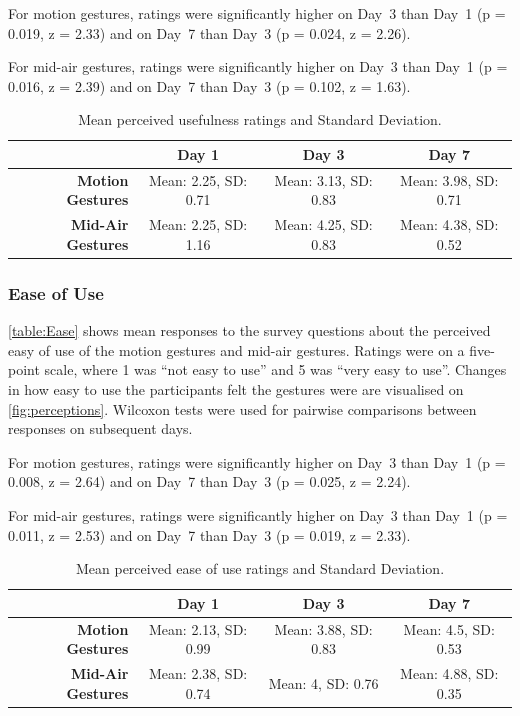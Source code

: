 \documentclass{l4proj}
\begin{document}
For motion gestures, ratings were significantly higher on Day~3 than Day~1 (p = 0.019, z = 2.33) and on Day~7 than Day~3 (p = 0.024, z = 2.26).

For mid-air gestures, ratings were significantly higher on Day~3 than Day~1 (p = 0.016, z = 2.39) and on Day~7 than Day~3 (p = 0.102, z = 1.63).

\begin{table}
\centering
\begin{tabular}{r c c c}
                              & \textbf{Day 1} & \textbf{Day 3} & \textbf{Day 7} \\ \toprule
    \textbf{Motion Gestures}  & Mean: 2.25, SD: 0.71   & Mean: 3.13, SD: 0.83    & Mean: 3.98, SD: 0.71  \\
    \textbf{Mid-Air Gestures} & Mean: 2.25, SD: 1.16   & Mean: 4.25, SD: 0.83    & Mean: 4.38, SD: 0.52 \\ \bottomrule
\end{tabular}
\caption{Mean perceived usefulness ratings and Standard Deviation.}
\label{table:usefulness}
\end{table}




\subsubsection{Ease of Use}

\autoref{table:Ease} shows mean responses to the survey questions about the perceived easy of use of the motion gestures and mid-air gestures. Ratings were on a five-point scale, where 1 was ``not easy to use'' and 5 was ``very easy to use''. Changes in how easy to use the participants felt the gestures were are visualised on \autoref{fig:perceptions}. Wilcoxon tests were used for pairwise comparisons between responses on subsequent days.

For motion gestures, ratings were significantly higher on Day~3 than Day~1 (p = 0.008, z = 2.64) and on Day~7 than Day~3 (p = 0.025, z = 2.24).

For mid-air gestures, ratings were significantly higher on Day~3 than Day~1 (p = 0.011, z = 2.53) and on Day~7 than Day~3 (p = 0.019, z = 2.33).

\begin{table}
\centering
\begin{tabular}{r c c c}
                              & \textbf{Day 1} & \textbf{Day 3} & \textbf{Day 7} \\ \toprule
    \textbf{Motion Gestures}  & Mean: 2.13, SD: 0.99    & Mean: 3.88, SD: 0.83    & Mean: 4.5, SD: 0.53\\
    \textbf{Mid-Air Gestures} & Mean: 2.38, SD: 0.74   & Mean: 4, SD: 0.76    & Mean: 4.88, SD: 0.35 \\ \bottomrule
\end{tabular}
\caption{Mean perceived ease of use ratings and Standard Deviation.}
\label{table:Ease}
\end{table}
\end{document}
